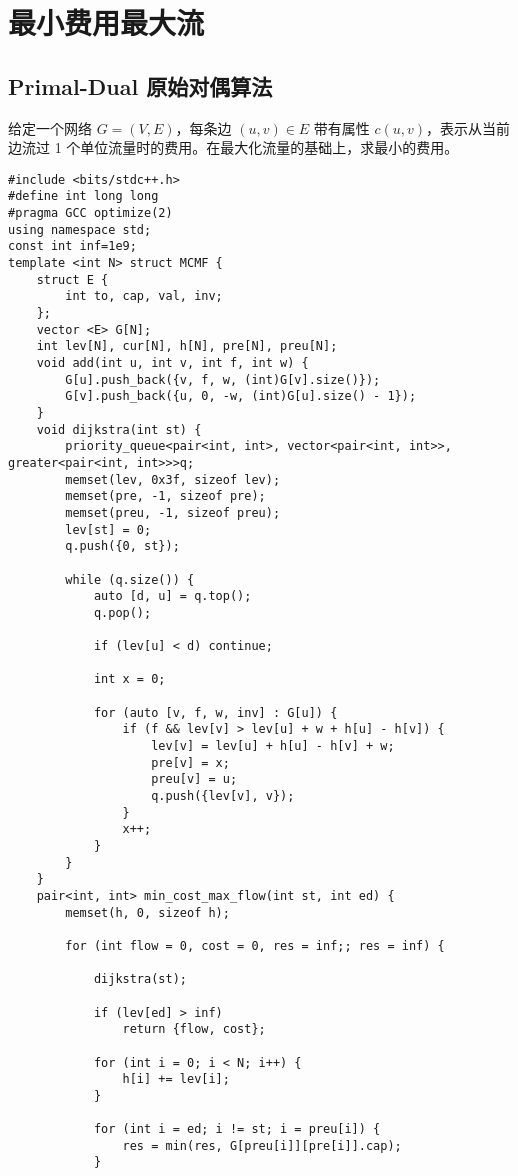 \section{最小费用最大流}
\subsection{Primal-Dual 原始对偶算法}
\par 给定一个网络 $G=(V, E)$，每条边 $(u, v) \in E$ 带有属性 $c(u, v)$，表示从当前边流过 1 个单位流量时的费用。在最大化流量的基础上，求最小的费用。

\begin{verbatim}
#include <bits/stdc++.h>
#define int long long
#pragma GCC optimize(2)
using namespace std;
const int inf=1e9;
template <int N> struct MCMF {
    struct E {
        int to, cap, val, inv;
    };
    vector <E> G[N];
    int lev[N], cur[N], h[N], pre[N], preu[N];
    void add(int u, int v, int f, int w) {
        G[u].push_back({v, f, w, (int)G[v].size()});
        G[v].push_back({u, 0, -w, (int)G[u].size() - 1});
    }
    void dijkstra(int st) {
        priority_queue<pair<int, int>, vector<pair<int, int>>, greater<pair<int, int>>>q;
        memset(lev, 0x3f, sizeof lev);
        memset(pre, -1, sizeof pre);
        memset(preu, -1, sizeof preu);
        lev[st] = 0;
        q.push({0, st});

        while (q.size()) {
            auto [d, u] = q.top();
            q.pop();

            if (lev[u] < d) continue;

            int x = 0;

            for (auto [v, f, w, inv] : G[u]) {
                if (f && lev[v] > lev[u] + w + h[u] - h[v]) {
                    lev[v] = lev[u] + h[u] - h[v] + w;
                    pre[v] = x;
                    preu[v] = u;
                    q.push({lev[v], v});
                }
                x++;
            }
        }
    }
    pair<int, int> min_cost_max_flow(int st, int ed) {
        memset(h, 0, sizeof h);

        for (int flow = 0, cost = 0, res = inf;; res = inf) {

            dijkstra(st);

            if (lev[ed] > inf)
                return {flow, cost};

            for (int i = 0; i < N; i++) {
                h[i] += lev[i];
            }

            for (int i = ed; i != st; i = preu[i]) {
                res = min(res, G[preu[i]][pre[i]].cap);
            }


\end{verbatim}
